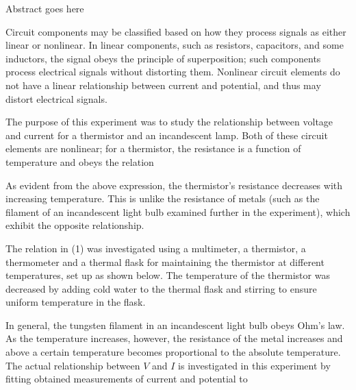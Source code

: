 
\physics

\begin{paperabs}
	
	Abstract goes here
	
\end{paperabs}

\begin{paper}
	

	Circuit components may be classified based on how they process signals as either linear or nonlinear. In linear components, such as resistors, capacitors, and some inductors, the signal obeys the principle of superposition; such components process electrical signals without distorting them. Nonlinear circuit elements do not have a linear relationship between current and potential, and thus may distort electrical signals. 
	
	The purpose of this experiment was to study the relationship between voltage and current for a thermistor and an incandescent lamp. Both of these circuit elements are nonlinear; for a thermistor, the resistance is a function of temperature and obeys the relation
	
	\begin{paperwhere}
	\end{paperwhere}

	As evident from the above expression, the thermistor's resistance decreases with increasing temperature. This is unlike the resistance of metals (such as the filament of an incandescent light bulb examined further in the experiment), which exhibit the opposite relationship.

	The relation in (1) was investigated using a multimeter, a thermistor, a thermometer and a thermal flask for maintaining the thermistor at different temperatures, set up as shown below. The temperature of the thermistor was decreased by adding cold water to the thermal flask and stirring to ensure uniform temperature in the flask. 
	
	
	In general, the tungsten filament in an incandescent light bulb obeys Ohm's law. As the temperature increases, however, the resistance of the metal increases and above a certain temperature becomes proportional to the absolute temperature. The actual relationship between \( V \) and \( I \) is investigated in this experiment by fitting obtained measurements of current and potential to 
	

\end{paper}

